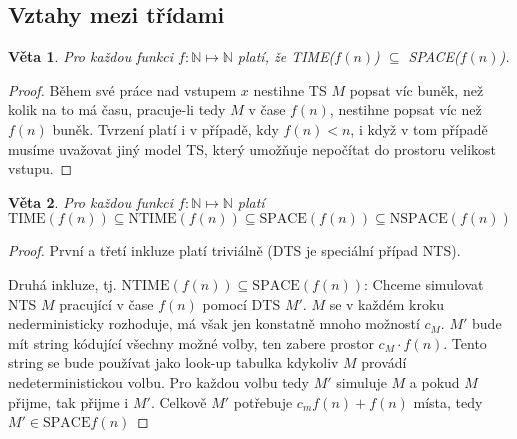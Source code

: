 \documentclass[11pt]{report} %
\newcommand{\N}{\mathbb{N}}
\newtheorem{theorem}{Věta}[section]
\numberwithin{equation}{section}
\begin{document}
\subsection{Vztahy mezi třídami}
\begin{theorem}
	Pro každou funkci $f : \N \mapsto \N$ platí, že \emph{TIME($f(n)$) $\subseteq$ SPACE($f(n)$)}.
\end{theorem}
\begin{proof}
	Během své práce nad vstupem $x$ nestihne TS $M$ popsat víc buněk, než kolik na to má času, pracuje-li tedy $M$ v čase $f(n)$, nestihne popsat víc než $f(n)$ buněk. Tvrzení platí i v případě, kdy $f(n) < n$, i když v tom případě musíme uvažovat jiný model TS, který umožňuje nepočítat do prostoru velikost vstupu.
\end{proof}

\begin{theorem}
\label{complexity_basic}
Pro každou funkci $f : \N \mapsto \N$ platí 
$$\text{TIME}(f(n)) \subseteq \text{NTIME}(f(n)) \subseteq \text{SPACE}(f(n)) \subseteq \text{NSPACE}(f(n))$$
\end{theorem}
\begin{proof}
První a třetí inkluze platí triviálně (DTS je speciální případ NTS). 

Druhá inkluze, tj. $\text{NTIME}(f(n)) \subseteq \text{SPACE}(f(n))$: Chceme simulovat NTS $M$ pracující v čase $f(n)$ pomocí DTS $M'$. $M$ se v každém kroku nederministicky rozhoduje, má však jen konstatně mnoho možností $c_M$. $M'$ bude mít string kódující všechny možné volby, ten zabere prostor $c_M\cdot f(n)$. Tento string se bude používat jako look-up tabulka kdykoliv $M$ provádí nedeterministickou volbu. Pro každou volbu tedy $M'$ simuluje $M$ a pokud $M$ přijme, tak přijme i $M'$. Celkově $M'$ potřebuje $c_mf(n) + f(n)$ místa, tedy $M' \in \text{SPACE}f(n)$
\end{proof}
\end{document}
